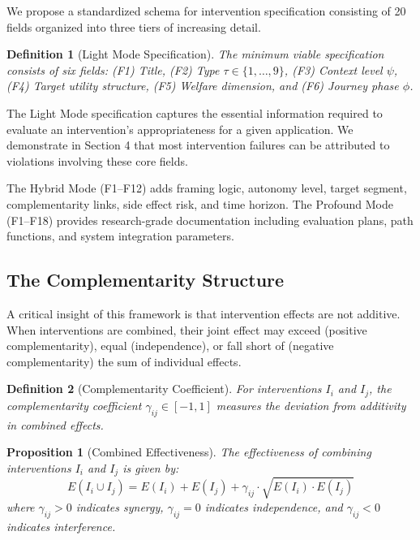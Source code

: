 \documentclass[12pt,a4paper]{article}
\newtheorem{proposition}{Proposition}
\newtheorem{definition}{Definition}
\begin{document}
We propose a standardized schema for intervention specification consisting of 20 fields organized into three tiers of increasing detail.

\begin{definition}[Light Mode Specification]
The minimum viable specification consists of six fields: (F1) Title, (F2) Type $\tau \in \{1, \ldots, 9\}$, (F3) Context level $\psi$, (F4) Target utility structure, (F5) Welfare dimension, and (F6) Journey phase $\phi$.
\end{definition}

The Light Mode specification captures the essential information required to evaluate an intervention's appropriateness for a given application. We demonstrate in Section 4 that most intervention failures can be attributed to violations involving these core fields.

The Hybrid Mode (F1--F12) adds framing logic, autonomy level, target segment, complementarity links, side effect risk, and time horizon. The Profound Mode (F1--F18) provides research-grade documentation including evaluation plans, path functions, and system integration parameters.

\subsection{The Complementarity Structure}

A critical insight of this framework is that intervention effects are not additive. When interventions are combined, their joint effect may exceed (positive complementarity), equal (independence), or fall short of (negative complementarity) the sum of individual effects.

\begin{definition}[Complementarity Coefficient]
For interventions $I_i$ and $I_j$, the complementarity coefficient $\gamma_{ij} \in [-1, 1]$ measures the deviation from additivity in combined effects.
\end{definition}

\begin{proposition}[Combined Effectiveness]
The effectiveness of combining interventions $I_i$ and $I_j$ is given by:
\begin{equation}
E(I_i \cup I_j) = E(I_i) + E(I_j) + \gamma_{ij} \cdot \sqrt{E(I_i) \cdot E(I_j)}
\label{eq:complementarity}
\end{equation}
where $\gamma_{ij} > 0$ indicates synergy, $\gamma_{ij} = 0$ indicates independence, and $\gamma_{ij} < 0$ indicates interference.
\end{proposition}
\end{document}
